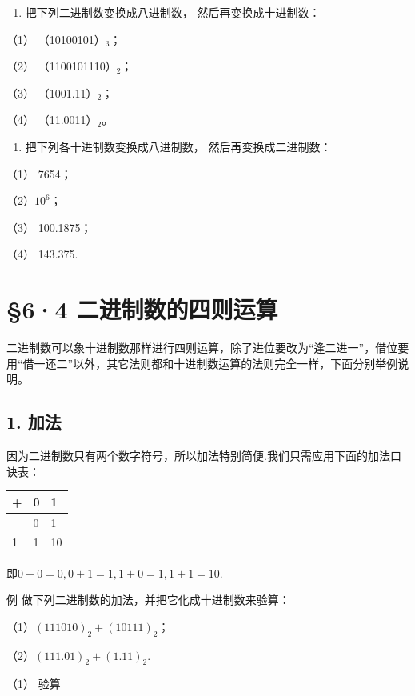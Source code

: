 \begin{enumerate}
\item
  把下列二进制数变换成八进制数， 然后再变换成十进制数：
\end{enumerate}

（1） （10100101）\(_{3}\)；

（2） （1100101110）\(_{2}\)；

（3） （1001.11）\(_{2}\)；

（4） （11.0011）\(_{2}\)。

\begin{enumerate}[start=2]
\item
  把下列各十进制数变换成八进制数， 然后再变换成二进制数：
\end{enumerate}

（1） 7654；

（2）\(10^{6}\)；

（3） 100.1875；

（4） 143.375.

\section{§6·4 二进制数的四则运算}

二进制数可以象十进制数那样进行四则运算，除了进位要改为``逢二进一''，借位要用``借一还二''以外，其它法则都和十进制数运算的法则完全一样，下面分别举例说明。

\subsection{1. 加法}

因为二进制数只有两个数字符号，所以加法特别简便.我们只需应用下面的加法口诀表：

{\def\LTcaptype{none} %
\begin{longtable}[]{@{}lll@{}}
\toprule\noalign{}
+ & 0 & 1 \\
\midrule\noalign{}
\endhead
\bottomrule\noalign{}
\endlastfoot
0 & 0 & 1 \\
1 & 1 & 10 \\
\end{longtable}
}

即\(0 + 0 = 0, 0 + 1 = 1, 1 + 0 = 1, 1 + 1 = 10.\)

例 做下列二进制数的加法，并把它化成十进制数来验算：

（1）\((111010)_2 + (10111)_2\)；

（2）\((111.01)_2 + (1.11)_2.\)

 （1） 验算

